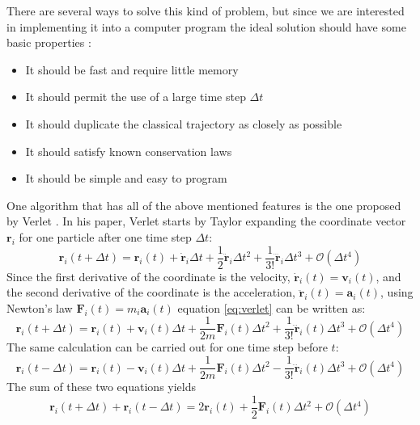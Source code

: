 \documentclass[12pt]{article}
\begin{document}
There are several ways to solve this kind of problem, but since we are interested in implementing it into a computer program the ideal solution
should have some basic properties \cite{Allen1989}:
\begin{itemize}
    \item It should be fast and require little memory
    \item It should permit the use of a large time step $\Delta t$
    \item It should duplicate the classical trajectory as closely as possible
    \item It should satisfy known conservation laws
    \item It should be simple and easy to program
\end{itemize}
One algorithm that has all of the above mentioned features is the one proposed by Verlet \cite{Verlet1967}. In his paper, Verlet starts by Taylor
expanding the coordinate vector $\mathbf{r}_i$ for one particle after one time step $\Delta t$:
\begin{equation}
    \label{eq:verlet}
    \mathbf{r}_i(t+\Delta t) = \mathbf{r}_i(t) + \dot{\mathbf{r}}_i \Delta t + \frac12 \ddot{\mathbf{r}}_i \Delta t^2 + \frac1{3!} \dddot{\mathbf{r}}_i \Delta t^3 +
    \mathcal{O}(\Delta t^4)
\end{equation}
Since the first derivative of the coordinate is the velocity, $\dot{\mathbf{r}}_i(t) = \mathbf{v}_i(t)$, and the second derivative of the coordinate 
is the acceleration, $\ddot{\mathbf{r}}_i(t) = \mathbf{a}_i(t)$, using Newton's law $\mathbf{F}_i(t) = m_i \mathbf{a}_i(t)$ equation \eqref{eq:verlet} 
can be written as:
\begin{equation}
    \label{eq:verletnew}
    \mathbf{r}_i(t+\Delta t) = \mathbf{r}_i(t) + {\mathbf{v}}_i(t) \Delta t + \frac1{2m} {\mathbf{F}}_i(t) \Delta t^2 + \frac1{3!} \dddot{\mathbf{r}}_i(t)
    \Delta t^3+\mathcal{O}(\Delta t^4)
\end{equation}
The same calculation can be carried out for one time step before $t$:
\begin{equation}
    \label{eq:verletnewminus}
    \mathbf{r}_i(t-\Delta t) = \mathbf{r}_i(t) - {\mathbf{v}}_i(t) \Delta t + \frac1{2m} {\mathbf{F}}_i(t) \Delta t^2 - \frac1{3!} \dddot{\mathbf{r}}_i(t) \Delta t^3+
    \mathcal{O}(\Delta t^4)
\end{equation}
The sum of these two equations yields
\begin{equation}
    \mathbf{r}_i(t+\Delta t) + \mathbf{r}_i(t-\Delta t) = 2\mathbf{r}_i(t) + \frac1{2} {\mathbf{F}}_i(t) \Delta t^2 + \mathcal{O}(\Delta t^4)
\end{equation}
\end{document}
